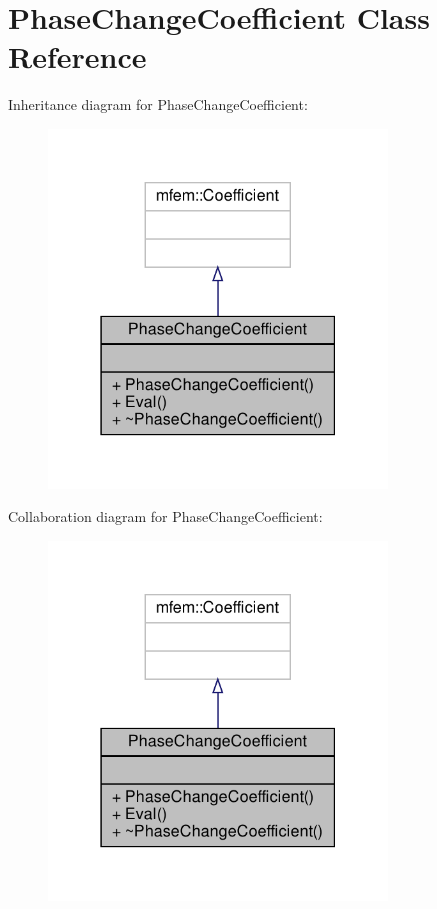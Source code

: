 \hypertarget{classPhaseChangeCoefficient}{}\section{Phase\+Change\+Coefficient Class Reference}
\label{classPhaseChangeCoefficient}


Inheritance diagram for Phase\+Change\+Coefficient\+:\nopagebreak
\begin{figure}[H]
\begin{center}
\leavevmode
\includegraphics[width=255pt]{classPhaseChangeCoefficient__inherit__graph}
\end{center}
\end{figure}


Collaboration diagram for Phase\+Change\+Coefficient\+:\nopagebreak
\begin{figure}[H]
\begin{center}
\leavevmode
\includegraphics[width=255pt]{classPhaseChangeCoefficient__coll__graph}
\end{center}
\end{figure}
